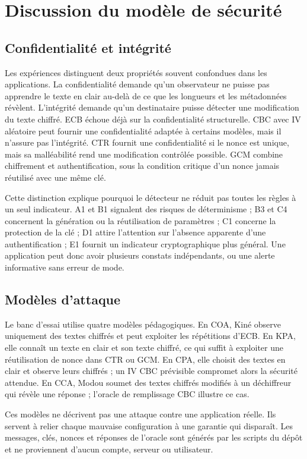 \documentclass[conference,a4paper]{IEEEtran}
\begin{document}
\section{Discussion du modèle de sécurité}

\subsection{Confidentialité et intégrité}
Les expériences distinguent deux propriétés souvent confondues dans les applications. La confidentialité demande qu'un observateur ne puisse pas apprendre le texte en clair au-delà de ce que les longueurs et les métadonnées révèlent. L'intégrité demande qu'un destinataire puisse détecter une modification du texte chiffré. ECB échoue déjà sur la confidentialité structurelle. CBC avec IV aléatoire peut fournir une confidentialité adaptée à certains modèles, mais il n'assure pas l'intégrité. CTR fournit une confidentialité si le nonce est unique, mais sa malléabilité rend une modification contrôlée possible. GCM combine chiffrement et authentification, sous la condition critique d'un nonce jamais réutilisé avec une même clé.

Cette distinction explique pourquoi le détecteur ne réduit pas toutes les règles à un seul indicateur. A1 et B1 signalent des risques de déterminisme ; B3 et C4 concernent la génération ou la réutilisation de paramètres ; C1 concerne la protection de la clé ; D1 attire l'attention sur l'absence apparente d'une authentification ; E1 fournit un indicateur cryptographique plus général. Une application peut donc avoir plusieurs constats indépendants, ou une alerte informative sans erreur de mode.

\subsection{Modèles d'attaque}
Le banc d'essai utilise quatre modèles pédagogiques. En COA, Kiné observe uniquement des textes chiffrés et peut exploiter les répétitions d'ECB. En KPA, elle connaît un texte en clair et son texte chiffré, ce qui suffit à exploiter une réutilisation de nonce dans CTR ou GCM. En CPA, elle choisit des textes en clair et observe leurs chiffrés ; un IV CBC prévisible compromet alors la sécurité attendue. En CCA, Modou soumet des textes chiffrés modifiés à un déchiffreur qui révèle une réponse ; l'oracle de remplissage CBC illustre ce cas.

Ces modèles ne décrivent pas une attaque contre une application réelle. Ils servent à relier chaque mauvaise configuration à une garantie qui disparaît. Les messages, clés, nonces et réponses de l'oracle sont générés par les scripts du dépôt et ne proviennent d'aucun compte, serveur ou utilisateur.
\end{document}
